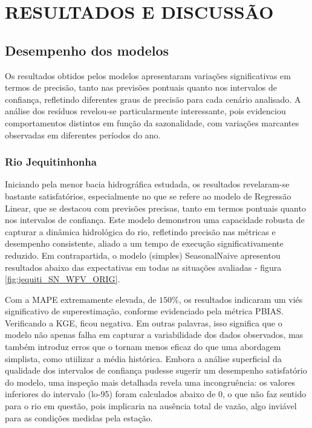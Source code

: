 \chapter{RESULTADOS E DISCUSS\~AO}
\label{cap:capitulo4}

\section{Desempenho dos modelos}

Os resultados obtidos pelos modelos apresentaram variações significativas em termos de precisão, tanto nas previsões pontuais quanto nos intervalos de confiança, refletindo diferentes graus de precisão para cada cenário analisado. A análise dos resíduos revelou-se particularmente interessante, pois evidenciou comportamentos distintos em função da sazonalidade, com variações marcantes observadas em diferentes períodos do ano.

\subsection{Rio Jequitinhonha}

Iniciando pela menor bacia hidrográfica estudada, os resultados revelaram-se bastante satisfatórios, especialmente no que se refere ao modelo de Regressão Linear, que se destacou com previsões precisas, tanto em termos pontuais quanto nos intervalos de confiança. Este modelo demonstrou uma capacidade robusta de capturar a dinâmica hidrológica do rio, refletindo precisão nas métricas e desempenho consistente, aliado a um tempo de execução significativamente reduzido. Em contrapartida, o modelo (simples) SeasonalNaive apresentou resultados abaixo das expectativas em todas as situações avaliadas - figura \ref{fig:jequiti_SN_WFV_ORIG}.

Com a MAPE extremamente elevada, de $150\%$, os resultados indicaram um viés significativo de superestimação, conforme evidenciado pela métrica PBIAS. Verificando a KGE, ficou negativa. Em outras palavras, isso significa que o modelo não apenas falha em capturar a variabilidade dos dados observados, mas também introduz erros que o tornam menos eficaz do que uma abordagem simplista, como utiilizar a média histórica. Embora a análise superficial da qualidade dos intervalos de confiança pudesse sugerir um desempenho satisfatório do modelo, uma inspeção mais detalhada revela uma incongruência: os valores inferiores do intervalo (lo-95) foram calculados abaixo de $0$, o que não faz sentido para o rio em questão, pois implicaria na ausência total de vazão, algo inviável para as condições medidas pela estação.

